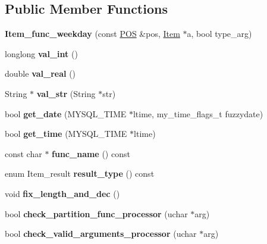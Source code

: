 \subsection*{Public Member Functions}
\begin{DoxyCompactItemize}
\item 
\mbox{\label{classItem__func__weekday_a0aa825f5527672730394ec998fe20159}} 
{\bfseries Item\+\_\+func\+\_\+weekday} (const \mbox{\hyperlink{structYYLTYPE}{P\+OS}} \&pos, \mbox{\hyperlink{classItem}{Item}} $\ast$a, bool type\+\_\+arg)
\item 
\mbox{\label{classItem__func__weekday_af361f9216747c14be42d853056ceaaf6}} 
longlong {\bfseries val\+\_\+int} ()
\item 
\mbox{\label{classItem__func__weekday_a4a347d679eaf6b3d1084e45203b62843}} 
double {\bfseries val\+\_\+real} ()
\item 
\mbox{\label{classItem__func__weekday_acd65749e009e67efb9a2fe282e63c0fb}} 
String $\ast$ {\bfseries val\+\_\+str} (String $\ast$str)
\item 
\mbox{\label{classItem__func__weekday_aefc0e99e42dfdbc2d11b19541913cf6a}} 
bool {\bfseries get\+\_\+date} (M\+Y\+S\+Q\+L\+\_\+\+T\+I\+ME $\ast$ltime, my\+\_\+time\+\_\+flags\+\_\+t fuzzydate)
\item 
\mbox{\label{classItem__func__weekday_a21ef679a4066b270ef9c54c9134a366e}} 
bool {\bfseries get\+\_\+time} (M\+Y\+S\+Q\+L\+\_\+\+T\+I\+ME $\ast$ltime)
\item 
\mbox{\label{classItem__func__weekday_a006812e82698d7d9adf119ab145bf3c5}} 
const char $\ast$ {\bfseries func\+\_\+name} () const
\item 
\mbox{\label{classItem__func__weekday_a240313b368be7d40444e119d9b5c659e}} 
enum Item\+\_\+result {\bfseries result\+\_\+type} () const
\item 
\mbox{\label{classItem__func__weekday_a1e306419e5a7961fcf7d825e15e256ef}} 
void {\bfseries fix\+\_\+length\+\_\+and\+\_\+dec} ()
\item 
\mbox{\label{classItem__func__weekday_a42447de740e39bfd46a577171a5efc11}} 
bool {\bfseries check\+\_\+partition\+\_\+func\+\_\+processor} (uchar $\ast$arg)
\item 
\mbox{\label{classItem__func__weekday_a87f95c287a6bc79214052ba60fbfc4f4}} 
bool {\bfseries check\+\_\+valid\+\_\+arguments\+\_\+processor} (uchar $\ast$arg)
\end{DoxyCompactItemize}
